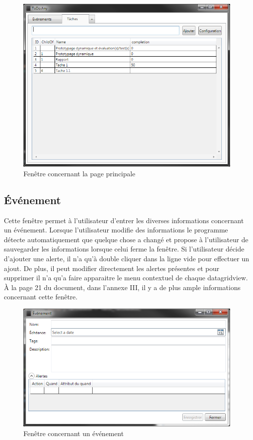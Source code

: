 \documentclass[letterpaper, oneside, 12pt, these, creativecommons]{thETS}
\begin{document}
\begin{figure}[H!]
	\centering
	\includegraphics[width=1\textwidth]{fenetre_main.png}
	\caption{Fenêtre concernant la page principale}
\end{figure}

\newpage

\subsection{Événement}

Cette fenêtre permet à l'utilisateur d'entrer les diverses informations concernant un événement. Lorsque l'utilisateur modifie des informations le programme détecte automatiquement que quelque chose a changé et propose à l'utilisateur de sauvegarder les informations lorsque celui ferme la fenêtre. Si l'utilisateur décide d'ajouter une alerte, il n'a qu'à double cliquer dans la ligne vide pour effectuer un ajout. De plus, il peut modifier directement les alertes présentes et pour supprimer il n'a qu'a faire apparaitre le menu contextuel de chaque datagridview. À la page 21 du document, dans l'annexe III, il y a de plus ample informations concernant cette fenêtre.

\begin{figure}[H!]
	\centering
	\includegraphics[width=1\textwidth]{fenetre_evenement.png}
	\caption{Fenêtre concernant un événement}
\end{figure}
\end{document}
